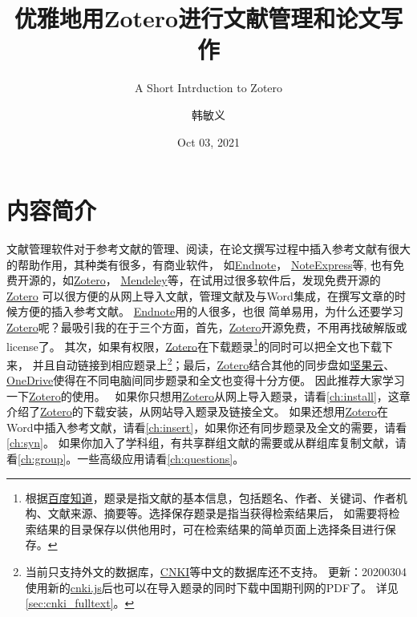 \documentclass[cn,11pt,chinese]{elegantbook}
\title{优雅地用Zotero进行文献管理和论文写作}
\subtitle{A Short Intrduction to Zotero}
\author{韩敏义}
\institute{南京农业大学\\\kaishu\hspace{1.1cm}温氏食品集团股份有限公司}
\date{Oct 03, 2021}
\begin{document}
 
\maketitle
\frontmatter

  \chapter*{内容简介}
	
		文献管理软件对于参考文献的管理、阅读，在论文撰写过程中插入参考文献有很大的帮助作用，其种类有很多，有商业软件，
		如\href{https://endnote.com/}{Endnote}，
		\href{http://www.inoteexpress.com/aegean/}{NoteExpress}等,
		也有免费开源的，如\href{https://www.zotero.org/}{Zotero}，
		\href{https://www.mendeley.com/download-reference-manager/}{Mendeley}等，在试用过很多软件后，发现免费开源的\href{https://www.zotero.org/}{Zotero}
		可以很方便的从网上导入文献，管理文献及与Word集成，在撰写文章的时候方便的插入参考文献。
		\href{https://endnote.com/}{Endnote}用的人很多，也很
		简单易用，为什么还要学习\href{https://www.zotero.org/}{Zotero}呢？最吸引我的在于三个方面，首先，\href{https://www.zotero.org/}{Zotero}开源免费，不用再找破解版或license了。
		其次，如果有权限，\href{https://www.zotero.org/}{Zotero}在下载题录\footnote{根据\href{https://zhidao.baidu.com/question/443193991.html}
		{百度知道}，题录是指文献的基本信息，包括题名、作者、关键词、作者机构、文献来源、摘要等。选择保存题录是指当获得检索结果后，
		如需要将检索结果的目录保存以供他用时，可在检索结果的简单页面上选择条目进行保存。}的同时可以把全文也下载下来，
		并且自动链接到相应题录上\footnote{当前只支持外文的数据库，\href{http://www.cnki.net}{CNKI}等中文的数据库还不支持。
		更新：20200304 使用新的\href{https://github.com/Zotero-CN/translators_CN}{cnki.js}后也可以在导入题录的同时下载中国期刊网的PDF了。
		详见\cref{sec:cnki_fulltext}。}；最后，\href{https://www.zotero.org/}{Zotero}结合其他的同步盘如\href{https://www.jianguoyun.com}{坚果云}、
		\href{https://office.live.com/start/OneDrive.aspx}{OneDrive}使得在不同电脑间同步题录和全文也变得十分方便。
		因此推荐大家学习一下\href{https://www.zotero.org/}{Zotero}的使用。
		\
		如果你只想用\href{https://www.zotero.org/}{Zotero}从网上导入题录，请看\cref{ch:install}，这章介绍了\href{https://www.zotero.org/}{Zotero}的下载安装，从网站导入题录及链接全文。
		如果还想用\href{https://www.zotero.org/}{Zotero}在Word中插入参考文献，请看\cref{ch:insert}，如果你还有同步题录及全文的需要，请看\cref{ch:syn}。
		如果你加入了学科组，有共享群组文献的需要或从群组库复制文献，请看\cref{ch:group}。一些高级应用请看\cref{ch:questions}。
		
\end{document}
